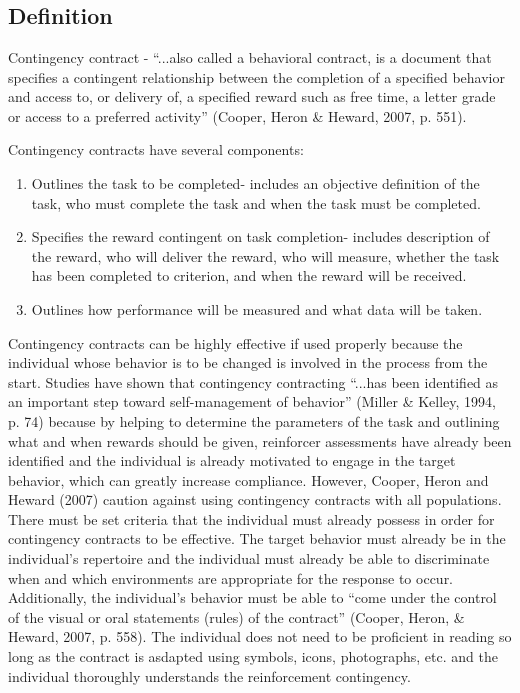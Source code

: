 \clearpage \section[\foureFour{}]{\foureFour{}%
              }
\subsection{Definition}
Contingency contract -  ``...also called a behavioral contract, is a document that specifies a contingent relationship between the completion of a specified behavior and access to, or delivery of, a specified reward such as free time, a letter grade or access to a preferred activity'' (Cooper, Heron \& Heward, 2007, p. 551). 

Contingency contracts have several components: 
\begin{enumerate}
\item Outlines the task to be completed- includes an objective definition of the task, who must complete the task and when the task must be completed.
\item Specifies the reward contingent on task completion- includes description of the reward, who will deliver the reward, who will measure, whether the task has been completed to criterion, and when the reward will be received.
\item Outlines how performance will be measured and what data will be taken. 
\end{enumerate}

Contingency contracts can be highly effective if used properly because the individual whose behavior is to be changed is involved in the process from the start. Studies have shown that contingency contracting ``...has been identified as an important step toward self-management of behavior'' (Miller \& Kelley, 1994, p. 74) because by helping to determine the parameters of the task and outlining what and when rewards should be given, reinforcer assessments have already been identified and the individual is already motivated to engage in the target behavior, which can greatly increase compliance. However, Cooper, Heron and Heward (2007) caution against using contingency contracts with all populations. There must be set criteria that the individual must already possess in order for contingency contracts to be effective. The target behavior must already be in the individual's repertoire and the individual must already be able to discriminate when and which environments are appropriate for the response to occur. Additionally, the individual's behavior must be able to ``come under the control of the visual or oral statements (rules) of the contract'' (Cooper, Heron, \& Heward, 2007, p. 558).  The individual does not need to be proficient in reading so long as the contract is asdapted using symbols, icons, photographs, etc. and the individual thoroughly understands the reinforcement contingency. 
%
